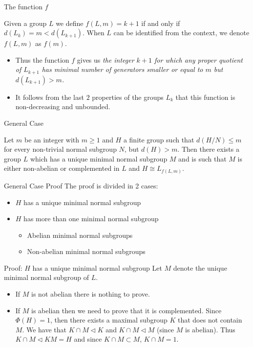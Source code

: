 \documentclass{beamer}
\newcommand{\nsub}{\triangleleft}
\begin{document}
\begin{frame}{The function $f$}
    \begin{definition}
        Given a group $L$ we define $f(L, m) = k+1$ if and only if $d(L_k) = m < d(L_{k+1})$. When $L$ can be identified from the context, we denote $f(L,m)$ as $f(m)$.
    \end{definition}
    \begin{itemize}
        \item<2-> Thus the function $f$ gives us \textit{the integer $k+1$ for which any proper quotient of $L_{k+1}$ has minimal number of generators smaller or equal to $m$ but $d(L_{k+1}) > m$.}
        \item<3-> It follows from the last $2$ properties of the groups $L_k$ that this function is non-decreasing and unbounded. 
    \end{itemize}
\end{frame}

\begin{frame}{General Case}
    \begin{theorem}
        Let $m$ be an integer with $m \ge 1$ and $H$ a finite group such that $d(H/N) \le m$ for every non-trivial normal subgroup $N$, but $d(H) > m$. Then there exists a group $L$ which has a unique minimal normal subgroup $M$ and is such that $M$ is either non-abelian or complemented in $L$ and $H \cong L_{f(L,m)}$.
    \end{theorem}    

\end{frame}

\begin{frame}{General Case Proof}
    The proof is divided in 2 cases:
    \begin{itemize}
        \item<2-> $H$ has a unique minimal normal subgroup
        \item<3-> $H$ has more than one minimal normal subgroup
        \begin{itemize}
            \item<4-> Abelian minimal normal subgroups
            \item<5-> Non-abelian minimal normal subgroups
        \end{itemize}
    \end{itemize}
\end{frame}

\begin{frame}{Proof: $H$ has a unique minimal normal subgroup}
    Let $M$ denote the unique minimal normal subgroup of $L$. 
    \begin{itemize}
        \item<2-> If $M$ is not abelian there is nothing to prove.
        \item<3-> If $M$ is abelian then we need to prove that it is complemented. 
        Since $\Phi(H) = 1$, then there exists a maximal subgroup $K$ that does not contain $M$. We have that $K \cap M \nsub K$ and $K \cap M \nsub M$ (since $M$ is abelian). Thus $K \cap M \nsub KM = H$ and since $K \cap M \subset M$, $K \cap M = 1$. 
    \end{itemize}
\end{frame}
\end{document}
